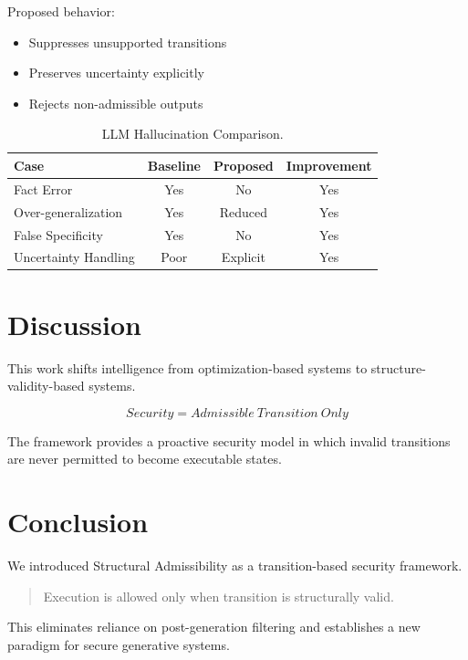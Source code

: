 \documentclass[11pt]{article}
\begin{document}
Proposed behavior:
\begin{itemize}
\item Suppresses unsupported transitions
\item Preserves uncertainty explicitly
\item Rejects non-admissible outputs
\end{itemize}

\begin{table}[h]
\centering
\caption{LLM Hallucination Comparison.}
\begin{tabular}{lccc}
\toprule
Case & Baseline & Proposed & Improvement \\
\midrule
Fact Error & Yes & No & Yes \\
Over-generalization & Yes & Reduced & Yes \\
False Specificity & Yes & No & Yes \\
Uncertainty Handling & Poor & Explicit & Yes \\
\bottomrule
\end{tabular}
\end{table}

\section{Discussion}

This work shifts intelligence from optimization-based systems to structure-validity-based systems.

\[
Security = Admissible\ Transition\ Only
\]

The framework provides a proactive security model in which invalid transitions are never permitted to become executable states.

\section{Conclusion}

We introduced Structural Admissibility as a transition-based security framework.

\begin{quote}
Execution is allowed only when transition is structurally valid.
\end{quote}

This eliminates reliance on post-generation filtering and establishes a new paradigm for secure generative systems.



\end{document}
